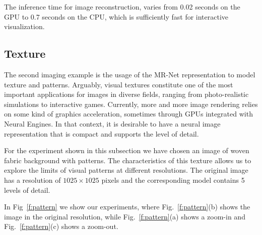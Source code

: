 The inference time for image reconstruction, varies from 0.02 seconds on the GPU to 0.7 seconds on the CPU, which is sufficiently fast for interactive visualization.

\subsection{Texture}

The second imaging example is the usage of the MR-Net representation to model texture and patterns. Arguably, visual textures constitute one of the most important applications for images in diverse fields, ranging from photo-realistic simulations to interactive games. Currently, more and more image rendering relies on some kind of graphics acceleration, sometimes through GPUs integrated with Neural Engines. In that context, it is desirable to have a neural image representation that is compact and supports the level of detail.

For the experiment shown in this subsection we have chosen an image of woven fabric background with patterns. The characteristics of this texture allows us to explore the limits of visual patterns at different resolutions. The original image has a resolution of $1025\times 1025$ pixels and the corresponding model contains 5 levels of detail.

In Fig~\ref{f:pattern} we show our experiments, where Fig.~\ref{f:pattern}(b) shows the image in the original resolution, while Fig.~\ref{f:pattern}(a) shows a zoom-in and Fig.~\ref{f:pattern}(c) shows a zoom-out.

